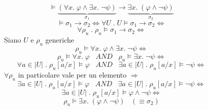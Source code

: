 \documentclass{article}
\theoremstyle{break}
\theoremstyle{break}
\theoremstyle{break}
\theoremstyle{break}
\begin{document}
\begin{figure}[H]
  \begin{exercise}
    \[
      \models \underbrace{(\forall x.\; \varphi \wedge \exists x.\; \neg \psi )}_{\sigma_1} \to \underbrace{\exists x.\; (\varphi \wedge \neg \psi )}_{\sigma_2}
    \] 
    \[
    \models \sigma_1 \to \sigma_2 \Leftrightarrow \forall U \;.\; U \models \sigma_1 \to \sigma_2 \Leftrightarrow
    \] 
    \[
    \forall \rho_u \;.\; \rho_u \models \sigma_1 \to \sigma_2 \Leftrightarrow
    \] 
    Siano \( U \) e \( \rho_u \) generiche
    \[
      \rho_u \models \forall x.\; \varphi \wedge \exists x.\; \neg \psi \Leftrightarrow
    \] 
    \[
    \rho_u \models \forall x.\; \varphi  \;\;\;AND\;\;\; \rho_u \models \exists x.\; \neg \psi \Leftrightarrow
    \] 
    \[
      \forall a \in |U| \;.\; \rho_u[a/x] \models \varphi \;\;\;AND\;\;\; \exists a \in |U| \;.\; \rho_u[a/x] \models \neg \psi \Leftrightarrow
    \] 
    \( \forall \rho_u \) in particolare vale per un elemento \( \Rightarrow \) 
    \[
    \exists a \in |U| \;.\; \rho_u[a/x] \models \varphi \;\;\;AND\;\;\; \exists a \in |U| \;.\; \rho_u[a/x] \models \neg \psi \Leftrightarrow
    \] 
    \[
      \exists a \in |U| \;.\; \rho_u[a/x] \models \varphi \wedge \neg \psi \Leftrightarrow
    \] 
    \[
    \rho_u \models \exists x.\; (\varphi \wedge \neg \psi ) \;\;\; (\equiv \sigma_2)
    \] 
  \end{exercise}
\end{figure}
\end{document}
